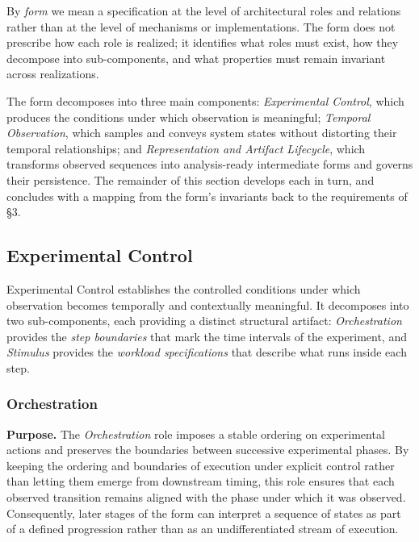By \emph{form} we mean a specification at the level of architectural roles and relations rather than at the level of mechanisms or implementations. The form does not prescribe how each role is realized; it identifies what roles must exist, how they decompose into sub-components, and what properties must remain invariant across realizations.

The form decomposes into three main components: \emph{Experimental Control}, which produces the conditions under which observation is meaningful; \emph{Temporal Observation}, which samples and conveys system states without distorting their temporal relationships; and \emph{Representation and Artifact Lifecycle}, which transforms observed sequences into analysis-ready intermediate forms and governs their persistence. The remainder of this section develops each in turn, and concludes with a mapping from the form's invariants back to the requirements of \S3.




\subsection{Experimental Control}\label{subsec:exp-control}

Experimental Control establishes the controlled conditions under which observation becomes temporally and contextually meaningful. It decomposes into two sub-components, each providing a distinct structural artifact: \emph{Orchestration} provides the \emph{step boundaries} that mark the time intervals of the experiment, and \emph{Stimulus} provides the \emph{workload specifications} that describe what runs inside each step.

  \subsubsection{Orchestration}\label{subsubsec:orchestration}
  \textbf{Purpose.} The \emph{Orchestration} role imposes a stable ordering on experimental actions and preserves the boundaries between successive experimental phases. By keeping the ordering and boundaries of execution under explicit control rather than letting them emerge from downstream timing, this role ensures that each observed transition remains aligned with the phase under which it was observed. Consequently, later stages of the form can interpret a sequence of states as part of a defined progression rather than as an undifferentiated stream of execution.

